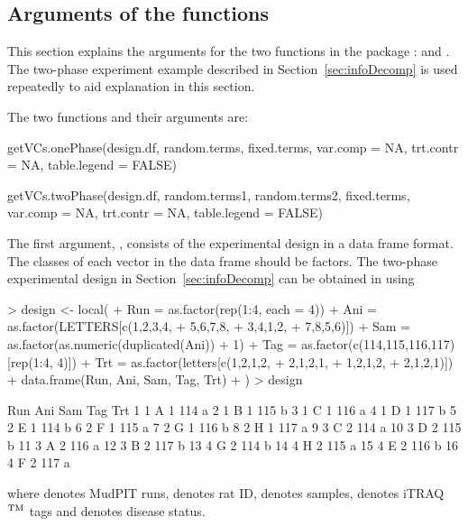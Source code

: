 \documentclass[article]{jss}
\begin{document}
\subsection{Arguments of the functions}
This section explains the arguments for the two functions in the package :  and . The two-phase experiment example described in Section~\ref{sec:infoDecomp} is used repeatedly to aid explanation in this section.

The two functions and their arguments are:
\begin{CodeChunk}
\begin{CodeInput}
getVCs.onePhase(design.df, random.terms, fixed.terms, var.comp = NA, 
trt.contr = NA, table.legend = FALSE)

getVCs.twoPhase(design.df, random.terms1, random.terms2, fixed.terms, 
var.comp = NA, trt.contr = NA, table.legend = FALSE)
\end{CodeInput}
\end{CodeChunk}

The first argument, , consists of the experimental design in a data frame format. The classes of each vector in the data frame should be factors. The two-phase experimental design in Section~\ref{sec:infoDecomp} can be obtained in  using
\begin{CodeChunk}
\begin{CodeInput}
> design <- local({ 
+   Run = as.factor(rep(1:4, each = 4))
+   Ani = as.factor(LETTERS[c(1,2,3,4,
+                             5,6,7,8,
+                             3,4,1,2,
+                             7,8,5,6)])
+   Sam = as.factor(as.numeric(duplicated(Ani)) + 1)
+   Tag = as.factor(c(114,115,116,117)[rep(1:4, 4)])
+   Trt = as.factor(letters[c(1,2,1,2,
+                             2,1,2,1,
+                             1,2,1,2,
+                             2,1,2,1)])
+   data.frame(Run, Ani, Sam, Tag, Trt)
+ })
> design
\end{CodeInput}
\begin{CodeOutput}
   Run Ani Sam Tag Trt
1    1   A   1 114   a
2    1   B   1 115   b
3    1   C   1 116   a
4    1   D   1 117   b
5    2   E   1 114   b
6    2   F   1 115   a
7    2   G   1 116   b
8    2   H   1 117   a
9    3   C   2 114   a
10   3   D   2 115   b
11   3   A   2 116   a
12   3   B   2 117   b
13   4   G   2 114   b
14   4   H   2 115   a
15   4   E   2 116   b
16   4   F   2 117   a
\end{CodeOutput}
\end{CodeChunk}
where  denotes MudPIT runs,  denotes rat ID,  denotes samples,  denotes iTRAQ$^{\rm TM}$ tags and  denotes disease status.
\end{document}
